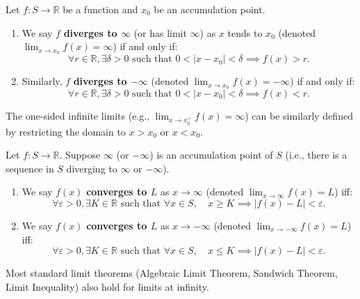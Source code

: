 \documentclass[
	UTF-8,
	11pt, %
	a4paper, %
]{LegrandOrangeBook}
\begin{document}
    \begin{definition}
    Let $f: S \to \mathbb{R}$ be a function and $x_0$ be an accumulation point.
    \begin{enumerate}
        \item We say $f$ \textbf{diverges to $\infty$} (or has limit $\infty$) as $x$ tends to $x_0$ (denoted $\lim_{x \to x_0} f(x) = \infty$) if and only if:
        \[ \forall r \in \mathbb{R}, \exists \delta > 0 \text{ such that } 0 < |x - x_0| < \delta \implies f(x) > r. \]
        
        \item Similarly, $f$ \textbf{diverges to $-\infty$} (denoted $\lim_{x \to x_0} f(x) = -\infty$) if and only if:
        \[ \forall r \in \mathbb{R}, \exists \delta > 0 \text{ such that } 0 < |x - x_0| < \delta \implies f(x) < r. \]
    \end{enumerate}
    \end{definition}

    \begin{remark}
    The one-sided infinite limits (e.g., $\lim_{x \to x_0^+} f(x) = \infty$) can be similarly defined by restricting the domain to $x > x_0$ or $x < x_0$.
    \end{remark}

    \begin{definition}
    Let $f: S \to \mathbb{R}$. Suppose $\infty$ (or $-\infty$) is an accumulation point of $S$ (i.e., there is a sequence in $S$ diverging to $\infty$ or $-\infty$).

    \begin{enumerate}
        \item We say $f(x)$ \textbf{converges to $L$} as $x \to \infty$ (denoted $\lim_{x \to \infty} f(x) = L$) iff:
        \[ \forall \varepsilon > 0, \exists K \in \mathbb{R} \text{ such that } \forall x \in S, \quad x \ge K \implies |f(x) - L| < \varepsilon. \]
        
        \item We say $f(x)$ \textbf{converges to $L$} as $x \to -\infty$ (denoted $\lim_{x \to -\infty} f(x) = L$) iff:
        \[ \forall \varepsilon > 0, \exists K \in \mathbb{R} \text{ such that } \forall x \in S, \quad x \le K \implies |f(x) - L| < \varepsilon. \]
    \end{enumerate}
    \end{definition}

    \begin{remark}
    Most standard limit theorems (Algebraic Limit Theorem, Sandwich Theorem, Limit Inequality) also hold for limits at infinity.
    \end{remark}
\end{document}
